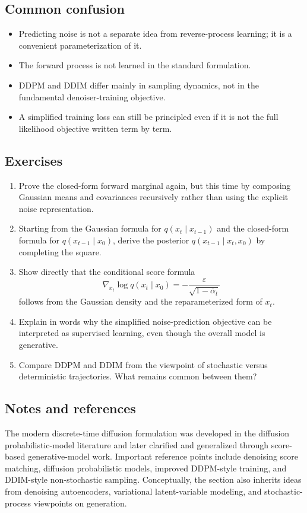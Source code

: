 \subsection*{Common confusion}

\begin{itemize}
    \item Predicting noise is not a separate idea from reverse-process learning; it is a convenient parameterization of it.
    \item The forward process is not learned in the standard formulation.
    \item DDPM and DDIM differ mainly in sampling dynamics, not in the fundamental denoiser-training objective.
    \item A simplified training loss can still be principled even if it is not the full likelihood objective written term by term.
\end{itemize}

\subsection*{Exercises}

\begin{enumerate}
    \item Prove the closed-form forward marginal again, but this time by composing Gaussian means and covariances recursively rather than using the explicit noise representation.
    \item Starting from the Gaussian formula for $q(x_t\mid x_{t-1})$ and the closed-form formula for $q(x_{t-1}\mid x_0)$, derive the posterior $q(x_{t-1}\mid x_t,x_0)$ by completing the square.
    \item Show directly that the conditional score formula
    \[
    \nabla_{x_t}\log q(x_t\mid x_0) = -\frac{\varepsilon}{\sqrt{1-\bar\alpha_t}}
    \]
    follows from the Gaussian density and the reparameterized form of $x_t$.
    \item Explain in words why the simplified noise-prediction objective can be interpreted as supervised learning, even though the overall model is generative.
    \item Compare DDPM and DDIM from the viewpoint of stochastic versus deterministic trajectories. What remains common between them?
\end{enumerate}

\subsection*{Notes and references}

The modern discrete-time diffusion formulation was developed in the diffusion probabilistic-model literature and later clarified and generalized through score-based generative-model work.
Important reference points include denoising score matching, diffusion probabilistic models, improved DDPM-style training, and DDIM-style non-stochastic sampling.
Conceptually, the section also inherits ideas from denoising autoencoders, variational latent-variable modeling, and stochastic-process viewpoints on generation.
